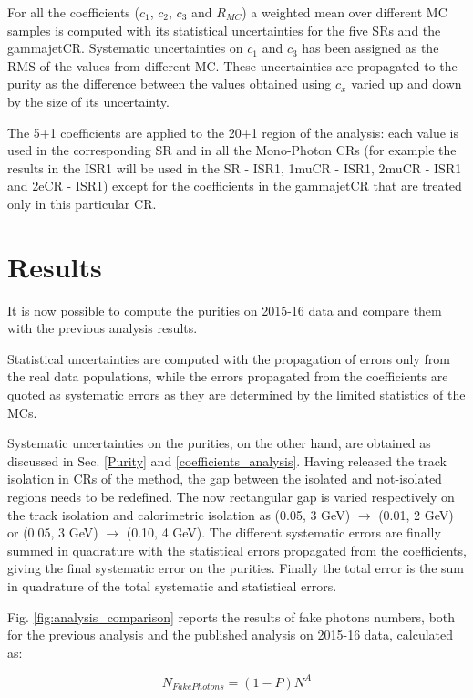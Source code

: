 \documentclass[11pt,a4paper,twoside,openright]{book}
\begin{document}
For all the coefficients ($c_{1}$, $c_{2}$, $c_{3}$ and $R_{MC}$) a weighted mean over different MC samples is computed with its statistical uncertainties for the five SRs and the gammajetCR. Systematic uncertainties on $c_{1}$ and $c_{3}$ has been assigned as the RMS of the values from different MC. These uncertainties are propagated to the purity as the difference between the values obtained using $c_{x}$ varied up and down by the size of its uncertainty.

The 5+1 coefficients are applied to the 20+1 region of the analysis: each value is used in the corresponding SR and in all the Mono-Photon CRs (for example the results in the ISR1 will be used in the SR - ISR1, 1muCR - ISR1, 2muCR - ISR1 and 2eCR - ISR1) except for the coefficients in the gammajetCR that are treated only in this particular CR.


\section{Results}

It is now possible to compute the purities on 2015-16 data and compare them with the previous analysis results.

Statistical uncertainties are computed with the propagation of errors only from the real data populations, while the errors propagated from the coefficients are quoted as systematic errors as they are determined by the limited statistics of the MCs.

Systematic uncertainties on the purities, on the other hand, are obtained as discussed in Sec. \ref{Purity} and \ref{coefficients_analysis}. Having released the track isolation in CRs of the method, the gap between the isolated and not-isolated regions needs to be redefined. The now rectangular gap is varied respectively on the track isolation and calorimetric isolation as (0.05, 3 GeV) $\rightarrow$ (0.01, 2 GeV) or (0.05, 3 GeV) $\rightarrow$ (0.10, 4 GeV). The different systematic errors are finally summed in quadrature with the statistical errors propagated from the coefficients, giving the final systematic error on the purities. Finally the total error is the sum in quadrature of the total systematic and statistical errors.

Fig. \ref{fig:analysis_comparison} reports the results of fake photons numbers, both for the previous analysis and the published analysis \cite{Mono-Photon_article} on 2015-16 data, calculated as:

\begin{equation}
    N_{FakePhotons} = (1 - P) N^{A}
\end{equation}
\end{document}

